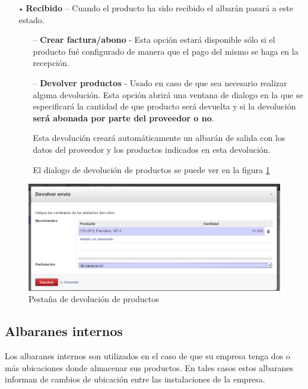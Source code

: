 \begin{itemize}
\item[$\star$] \textbf{Recibido} -- Cuando el producto ha sido recibido el albarán pasará a este estado.
  \begin{itemize}
  \item[--] \textbf{Crear factura/abono} - Esta opción estará disponible sólo si el producto fué configurado de manera que el pago del mismo se haga en la recepción.
  \item[--] \textbf{Devolver productos} - Usado en caso de que sea necesario realizar alguna devolución. Esta opción abrirá una ventana de dialogo en la que se especificará la cantidad de que producto será devuelta y si la devolución \textbf{será abonada por parte del proveedor o no}.

Esta devolución creará automáticamente un albarán de salida con los datos del proveedor y los productos indicados en esta devolución.

El dialogo de devolución de productos se puede ver en la figura \ref{al:devolver}
  \end{itemize}
\end{itemize}


\begin{figure}[H]
\includegraphics[width=\textwidth]{almacen/img/alb_entrada_dev.png}
\caption{Pestaña de devolución de productos}
\label{al:devolver}
\end{figure}




\vspace{0.5cm}
\subsection{Albaranes internos}
Los albaranes internos son utilizados en el caso de que su empresa tenga dos o más ubicaciones donde almacenar sus productos. En tales casos estos albaranes informan de cambios de ubicación entre las instalaciones de la empresa.


\vspace{0.5cm}
